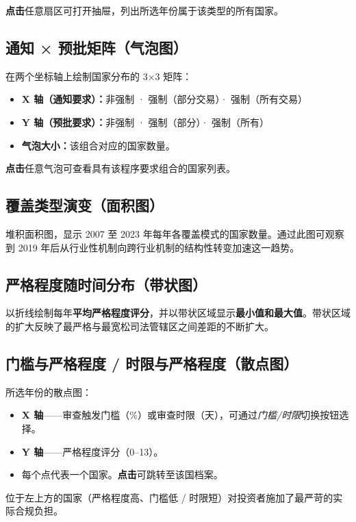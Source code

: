 \documentclass[12pt,a4paper]{article}
\newcommand{\uielem}[1]{\textit{#1}}
\begin{document}
\textbf{点击}任意扇区可打开抽屉，列出所选年份属于该类型的所有国家。

\subsection{通知 × 预批矩阵（气泡图）}

在两个坐标轴上绘制国家分布的 3×3 矩阵：

\begin{itemize}
  \item \textbf{X 轴（通知要求）：}非强制 · 强制（部分交易）· 强制（所有交易）
  \item \textbf{Y 轴（预批要求）：}非强制 · 强制（部分）· 强制（所有）
  \item \textbf{气泡大小：}该组合对应的国家数量。
\end{itemize}

\textbf{点击}任意气泡可查看具有该程序要求组合的国家列表。

\subsection{覆盖类型演变（面积图）}

堆积面积图，显示 2007 至 2023 年每年各覆盖模式的国家数量。通过此图可观察到 2019 年后从行业性机制向跨行业机制的结构性转变加速这一趋势。

\subsection{严格程度随时间分布（带状图）}

以折线绘制每年\textbf{平均严格程度评分}，并以带状区域显示\textbf{最小值和最大值}。带状区域的扩大反映了最严格与最宽松司法管辖区之间差距的不断扩大。

\subsection{门槛与严格程度 / 时限与严格程度（散点图）}

所选年份的散点图：
\begin{itemize}
  \item \textbf{X 轴}——审查触发门槛（\%）或审查时限（天），可通过\uielem{门槛/时限}切换按钮选择。
  \item \textbf{Y 轴}——严格程度评分（0--13）。
  \item 每个点代表一个国家。\textbf{点击}可跳转至该国档案。
\end{itemize}

位于左上方的国家（严格程度高、门槛低 / 时限短）对投资者施加了最严苛的实际合规负担。
\end{document}
